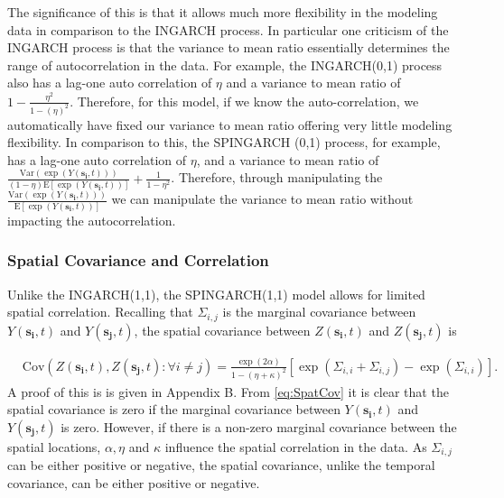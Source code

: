 \documentclass[11pt]{isuthesis}
\begin{document}
The significance of this is that it allows much more flexibility in the modeling data in comparison to the INGARCH process.  In particular one criticism of the INGARCH process is that the variance to mean ratio essentially determines the range of autocorrelation in the data.  For example, the INGARCH(0,1) process also has a lag-one auto correlation of $\eta$ and a variance to mean ratio of $1-\frac{\eta^2}{1-(\eta)^2}$.  Therefore, for this model, if we know the auto-correlation, we automatically have fixed our variance to mean ratio offering very little modeling flexibility.  In comparison to this, the SPINGARCH (0,1) process, for example, has a lag-one auto correlation of $\eta$, and a variance to mean ratio of $\frac{\mbox{Var} \left(\exp(Y(\boldsymbol{s_i},t))
	\right)}{(1-\eta) \mbox{E}\left[\exp(Y(\boldsymbol{s_i},t))\right]} + \frac{1}{1-\eta^2}$.  Therefore, through manipulating the $\frac{ \mbox{Var} \left(\exp(Y(\boldsymbol{s_i},t))\right)}{ \mbox{E}\left[\exp(Y(\boldsymbol{s_i},t))\right]}$ we can manipulate the variance to mean ratio without impacting the autocorrelation.




\subsubsection{Spatial Covariance and Correlation}
Unlike the INGARCH(1,1), the SPINGARCH(1,1) model allows for limited spatial correlation.  Recalling that $\Sigma_{i,j}$ is the marginal covariance between $Y(\boldsymbol{s_i},t)$ and $Y(\boldsymbol{s_j},t)$, the spatial covariance between $Z(\boldsymbol{s_i},t)$ and $Z(\boldsymbol{s_j},t)$ is

\begin{align}
	& \mbox{Cov}(Z(\boldsymbol{s_i},t),Z(\boldsymbol{s_j},t):\forall i \neq j) =  \frac{\exp(2\alpha)}{1-(\eta+\kappa)^2}\left[\exp(\Sigma_{i,i}+\Sigma_{i,j}) -\exp(\Sigma_{i,i})\right] \label{eq:SpatCov}.
\end{align}
A proof of this is is given in Appendix B.  From \eqref{eq:SpatCov} it is clear that the spatial covariance is zero if the marginal covariance between $Y(\boldsymbol{s_i},t)$ and $Y(\boldsymbol{s_j},t)$ is zero.  However, if there is a non-zero marginal covariance between the spatial locations, $\alpha,\eta$ and $\kappa$ influence the spatial correlation in the data. As $\Sigma_{i,j}$ can be either positive or negative, the spatial covariance, unlike the temporal covariance, can be either positive or negative.
\end{document}

